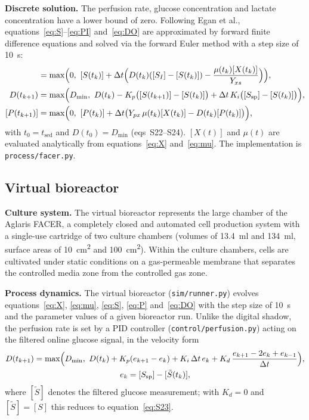 \documentclass[11pt,a4paper]{article}
\newcommand{\code}[1]{\texttt{#1}}
\newcommand{\tsed}{t_{\mathrm{sed}}}
\newcommand{\Ssp}{[S_{\mathrm{sp}}]}
\newcommand{\cX}{[X(t)]}
\begin{document}
\textbf{Discrete solution.} The perfusion rate, glucose concentration and lactate concentration have a
lower bound of zero. Following Egan et al., equations~\eqref{eq:S}--\eqref{eq:PI} and~\eqref{eq:DO}
are approximated by forward finite difference equations and solved via the forward Euler method
with a step size of \SI{10}{\second}:
\begin{align}
  [S(t_{k+1})] &= \max\Bigl(0,\ [S(t_k)] + \Delta t\Bigl(D(t_k)([S_I]-[S(t_k)]) - \frac{\mu(t_k)[X(t_k)]}{Y_{xs}}\Bigr)\Bigr), \label{eq:S22}\\
  D(t_{k+1}) &= \max\Bigl(D_{\min},\ D(t_k) - K_p\bigl([S(t_{k+1})]-[S(t_k)]\bigr) + \Delta t\,K_i\bigl(\Ssp - [S(t_k)]\bigr)\Bigr), \label{eq:S23}\\
  [P(t_{k+1})] &= \max\Bigl(0,\ [P(t_k)] + \Delta t\bigl(Y_{px}\,\mu(t_k)[X(t_k)] - D(t_k)[P(t_k)]\bigr)\Bigr), \label{eq:S24}
\end{align}
with $t_0=\tsed$ and $D(t_0)=D_{\min}$ (eqs~S22--S24). $\cX$ and $\mu(t)$ are evaluated analytically
from equations~\eqref{eq:X} and~\eqref{eq:mu}. The implementation is \code{process/facer.py}.

\subsection{Virtual bioreactor}

\textbf{Culture system.} The virtual bioreactor represents the large chamber of the Aglaris FACER, a
completely closed and automated cell production system with a single-use cartridge of two culture
chambers (volumes of \SI{13.4}{\milli\litre} and \SI{134}{\milli\litre}, surface areas of
\SI{10}{\centi\metre\squared} and \SI{100}{\centi\metre\squared}). Within the culture chambers,
cells are cultivated under static conditions on a gas-permeable membrane that separates the
controlled media zone from the controlled gas zone.

\textbf{Process dynamics.} The virtual bioreactor (\code{sim/runner.py}) evolves
equations~\eqref{eq:X}, \eqref{eq:mu}, \eqref{eq:S}, \eqref{eq:P} and~\eqref{eq:DO} with the step
size of \SI{10}{\second} and the parameter values of a given bioreactor run. Unlike the digital
shadow, the perfusion rate is set by a PID controller (\code{control/perfusion.py}) acting on the
filtered online glucose signal, in the velocity form
\begin{equation}
\begin{gathered}
  D(t_{k+1}) = \max\Bigl(D_{\min},\ D(t_k) + K_p(e_{k+1}-e_k) + K_i\,\Delta t\,e_k + K_d\,\frac{e_{k+1}-2e_k+e_{k-1}}{\Delta t}\Bigr),\\
  e_k = \Ssp - [\tilde S(t_k)],
\end{gathered}
  \label{eq:pid}
\end{equation}
where $[\tilde S]$ denotes the filtered glucose measurement; with $K_d=0$ and $[\tilde S]=[S]$ this
reduces to equation~\eqref{eq:S23}.
\end{document}
